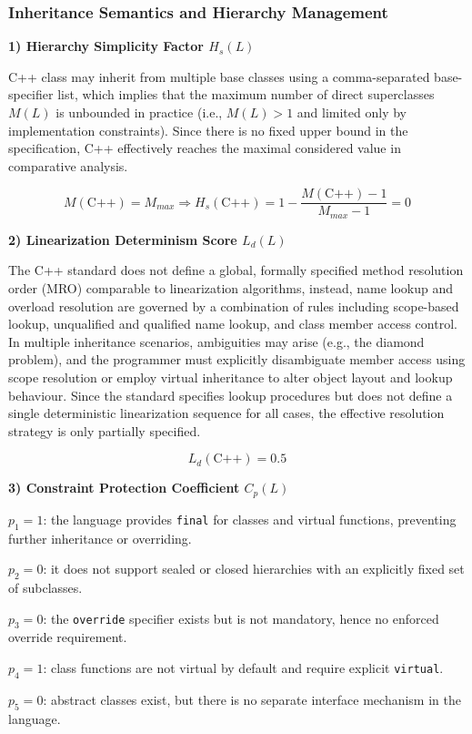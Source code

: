 \subsubsection{Inheritance Semantics and Hierarchy Management}

\textbf{1) Hierarchy Simplicity Factor $H_s(L)$}

C++ class may inherit from multiple base classes using a comma-separated base-specifier list, which implies that the maximum number of direct superclasses $M(L)$ is unbounded in practice (i.e., $M(L) > 1$ and limited only by implementation constraints). Since there is no fixed upper bound in the specification, C++ effectively reaches the maximal considered value in comparative analysis.

\[
    M(\text{C++}) = M_{max} \Rightarrow H_s(\text{C++}) = 1 - \frac{M(\text{C++}) - 1}{M_{max} - 1} = 0
\]

\textbf{2) Linearization Determinism Score $L_d(L)$}

The C++ standard does not define a global, formally specified method resolution order (MRO) comparable to linearization algorithms, instead, name lookup and overload resolution are governed by a combination of rules including scope-based lookup, unqualified and qualified name lookup, and class member access control. In multiple inheritance scenarios, ambiguities may arise (e.g., the diamond problem), and the programmer must explicitly disambiguate member access using scope resolution or employ virtual inheritance to alter object layout and lookup behaviour. Since the standard specifies lookup procedures but does not define a single deterministic linearization sequence for all cases, the effective resolution strategy is only partially specified.

\[
    L_d(\text{C++}) = 0.5
\]

\textbf{3) Constraint Protection Coefficient $C_p(L)$}

$p_1 = 1$: the language provides \texttt{final} for classes and virtual functions, preventing further inheritance or overriding.

$p_2 = 0$: it does not support sealed or closed hierarchies with an explicitly fixed set of subclasses.

$p_3 = 0$: the \texttt{override} specifier exists but is not mandatory, hence no enforced override requirement.

$p_4 = 1$: class functions are not virtual by default and require explicit \texttt{virtual}.

$p_5 = 0$: abstract classes exist, but there is no separate interface mechanism in the language.

